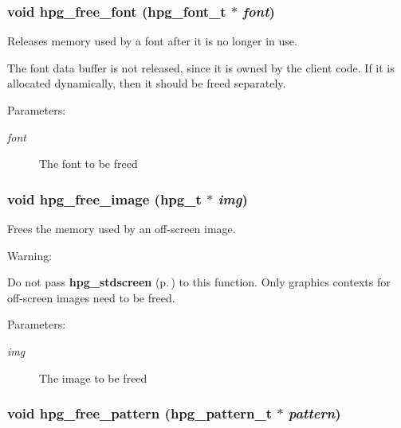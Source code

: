 \subsubsection{\setlength{\rightskip}{0pt plus 5cm}void hpg\_\-free\_\-font ({\bf hpg\_\-font\_\-t} $\ast$ {\em font})}\label{hpgraphics_8h_a73}


Releases memory used by a font after it is no longer in use.

The font data buffer is not released, since it is owned by the client code. If it is allocated dynamically, then it should be freed separately.\begin{Desc}
\item[Parameters: ]\par
\begin{description}
\item[{\em 
font}]The font to be freed \end{description}
\end{Desc}
\subsubsection{\setlength{\rightskip}{0pt plus 5cm}void hpg\_\-free\_\-image ({\bf hpg\_\-t} $\ast$ {\em img})}\label{hpgraphics_8h_a78}


Frees the memory used by an off-screen image.

\begin{Desc}
\item[Warning: ]\par
Do not pass {\bf hpg\_\-stdscreen} {\rm (p.\,\pageref{hpgraphics_8h_a27})} to this function. Only graphics contexts for off-screen images need to be freed.\end{Desc}
\begin{Desc}
\item[Parameters: ]\par
\begin{description}
\item[{\em 
img}]The image to be freed \end{description}
\end{Desc}
\subsubsection{\setlength{\rightskip}{0pt plus 5cm}void hpg\_\-free\_\-pattern ({\bf hpg\_\-pattern\_\-t} $\ast$ {\em pattern})}\label{hpgraphics_8h_a71}



